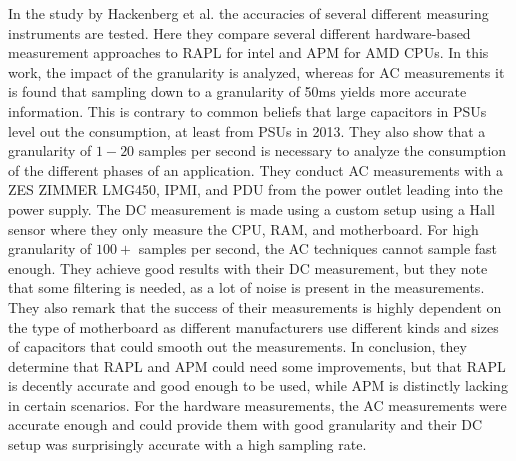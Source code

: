 In the study by Hackenberg et al.\cite{hackenberg2013} the accuracies of several different measuring instruments are tested. Here they compare several different hardware-based measurement approaches to RAPL for intel and APM for AMD CPUs. In this work, the impact of the granularity is analyzed, whereas for AC measurements it is found that sampling down to a granularity of 50ms yields more accurate information. This is contrary to common beliefs that large capacitors in PSUs level out the consumption, at least from PSUs in 2013. They also show that a granularity of $1-20$ samples per second is necessary to analyze the consumption of the different phases of an application. They conduct AC measurements with a ZES ZIMMER LMG450, IPMI, and PDU from the power outlet leading into the power supply. The DC measurement is made using a custom setup using a Hall sensor where they only measure the CPU, RAM, and motherboard. For high granularity of $100+$ samples per second, the AC techniques cannot sample fast enough. They achieve good results with their DC measurement, but they note that some filtering is needed, as a lot of noise is present in the measurements. They also remark that the success of their measurements is highly dependent on the type of motherboard as different manufacturers use different kinds and sizes of capacitors that could smooth out the measurements. In conclusion, they determine that RAPL and APM could need some improvements, but that RAPL is decently accurate and good enough to be used, while APM is distinctly lacking in certain scenarios. For the hardware measurements, the AC measurements were accurate enough and could provide them with good granularity and their DC setup was surprisingly accurate with a high sampling rate.\cite*{hackenberg2013}\newline
